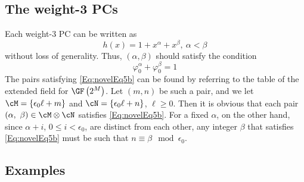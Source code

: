 \subsection{The weight-3 PCs}

Each weight-3 PC can be written as 
\begin{equation}
h(x)=1+x^{\alpha}+x^{\beta},~\alpha < \beta
\label{novelEqwt3}
\end{equation}
without loss of generality. 
Thus, $(\alpha,\beta)$ should satisfy the condition
\begin{equation}
\varphi_0^{\alpha}+\varphi_0^{\beta}= 1
\label{Eq:novelEq5b}
\end{equation}
The pairs satisfying \eqref{Eq:novelEq5b} can be found by referring to the table of the extended field for $\GF\left(2^M\right)$. 
Let $(m,n)$ be such a pair, and we let $\cM=\{\epsilon_0 \ell+m\}$ and $\cN=\{\epsilon_0 \ell+n\}$, $\ell \geq 0$. Then it is obvious that each pair $(\alpha,~\beta) \in \cM \otimes \cN$ satisfies
\eqref{Eq:novelEq5b}. For a fixed $\alpha$, on the other hand, since $\alpha+i$, $0 \leq i < \epsilon_0$, are distinct from each other, any integer $\beta$ that satisfies \eqref{Eq:novelEq5b} must be such that $n\equiv \beta \mod \epsilon_0$.

\subsection{Examples}

